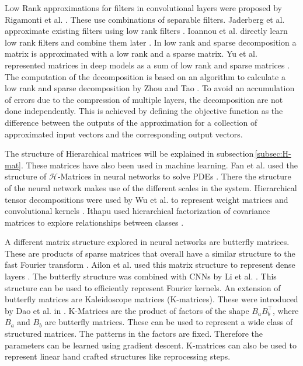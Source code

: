 \documentclass[numbers=noenddot,doctype=mastersthesis,BCOR=15mm,biblatex]{ldvbook}%
\begin{document}
Low Rank approximations for filters in convolutional layers were proposed by Rigamonti et al. \cite{rigamonti_learning_2013}. These use combinations of separable filters. Jaderberg et al. approximate existing filters using low rank filters \cite{jaderberg_speeding_2014}. 
Ioannou et al. directly learn low rank filters and combine them later \cite{ioannou_training_2016}.
In low rank and sparse decomposition a matrix is approximated with a low rank and a sparse matrix. 
Yu et al. represented matrices in deep models as a sum of low rank and sparse matrices \cite{yu_compressing_2017}.
The computation of the decomposition is based on an algorithm to calculate a low rank and sparse decomposition by Zhou and Tao \cite{zhou_greedy_2013}.
To avoid an accumulation of errors due to the compression of multiple layers, the decomposition are not done independently.
This is achieved by defining the objective function as the difference between the outputs of the approximation for a collection of approximated input vectors and the corresponding output vectors.

The structure of Hierarchical matrices will be explained in subsection\,\ref{subsec:H-mat}. These matrices have also been used in machine learning. 
Fan et al. used the structure of $\mathcal{H}$-Matrices in neural networks to solve PDEs \cite{fan_multiscale_2019}. There the structure of the neural network makes use of the different scales in the system.
Hierarchical tensor decompositions were used by Wu et al. to represent weight matrices and convolutional kernels \cite{wu_hybrid_2020}.
Ithapu used hierarchical factorization of covariance matrices to explore relationships between classes \cite{ithapu_decoding_2017}.

A different matrix structure explored in neural networks are butterfly matrices.
These are products of sparse matrices that overall have a similar structure to the fast Fourier transform \cite{li_butterfly_2015,parker_random_1995}. Ailon et al. used this matrix structure to represent dense layers \cite{ailon_sparse_2021}.
The butterfly structure was combined with CNNs by Li et al. \cite{li_butterfly-net_2020}. This structure can be used to efficiently represent Fourier kernels.
An extension of butterfly matrices are Kaleidoscope matrices (K-matrices). These were introduced by Dao et al. in \cite{dao_kaleidoscope_2020}.
K-Matrices are the product of factors of the shape $B_aB_b^\top$, where $B_a$ and $B_b$ are butterfly matrices. These can be used to represent a wide class of structured matrices.
The patterns in the factors are fixed. Therefore the parameters can be learned using gradient descent.
K-matrices can also be used to represent linear hand crafted structures like reprocessing steps. %
\end{document}
